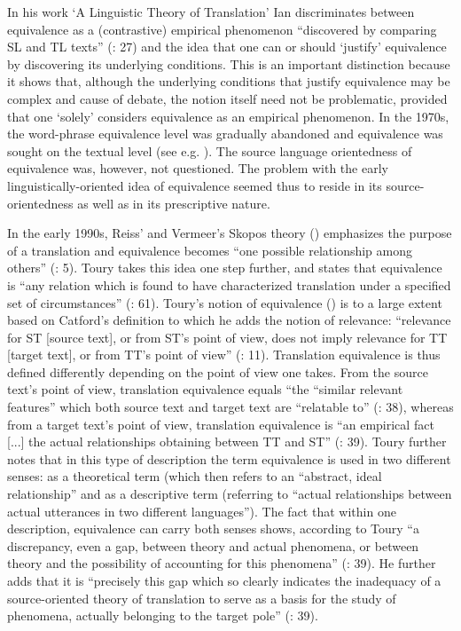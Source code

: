 In his work ‘A Linguistic Theory of Translation’ Ian \citet{catford_linguistic_1965} discriminates between equivalence as a (contrastive) empirical phenomenon “discovered by comparing SL and TL texts” (\citealt{catford_linguistic_1965}: 27) and the idea that one can or should ‘justify’ equivalence by discovering its underlying conditions. This is an important distinction because it shows that, although the underlying conditions that justify equivalence may be complex and cause of debate, the notion itself need not be problematic, provided that one ‘solely’ considers equivalence as an empirical phenomenon. In the 1970s, the word-phrase equivalence level was gradually abandoned and equivalence was sought on the textual level (see e.g. \citealt{koller_einfuhrung_1979}). The source language orientedness of equivalence was, however, not questioned. The problem with the early linguistically-oriented idea of equivalence seemed thus to reside in its source-orientedness as well as in its prescriptive nature.



In the early 1990s, Reiss’ and Vermeer’s Skopos theory (\citeyear{reiss_grundlegung_1991}) emphasizes the purpose of a translation and equivalence becomes “one possible relationship among others” (\citealt{schaffner_concept_1999}: 5). Toury takes this idea one step further, and states that equivalence is “any relation which is found to have characterized translation under a specified set of circumstances” (\citealt{toury_descriptive_1995}: 61). Toury’s notion of equivalence (\citeyear[37 ff.]{toury_search_1980}) is to a large extent based on Catford’s definition to which he adds the notion of relevance: “relevance for ST [source text], or from ST’s point of view, does not imply relevance for TT [target text], or from TT’s point of view” (\citealt{toury_search_1980}: 11). Translation equivalence is thus defined differently depending on the point of view one takes. From the source text’s point of view, translation equivalence equals “the “similar relevant features” which both source text and target text are “relatable to” (\citealt{toury_search_1980}: 38), whereas from a target text’s point of view, translation equivalence is “an empirical fact [...] the actual relationships obtaining between TT and ST” (\citealt{toury_search_1980}: 39). Toury further notes that in this type of description the term equivalence is used in two different senses: as a theoretical term (which then refers to an “abstract, ideal relationship” and as a descriptive term (referring to “actual relationships between actual utterances in two different languages”). The fact that within one description, equivalence can carry both senses shows, according to Toury “a discrepancy, even a gap, between theory and actual phenomena, or between theory and the possibility of accounting for this phenomena” (\citealt{toury_search_1980}: 39). He further adds that it is “precisely this gap which so clearly indicates the inadequacy of a source-oriented theory of translation to serve as a basis for the study of phenomena, actually belonging to the target pole” (\citealt{toury_search_1980}: 39).



